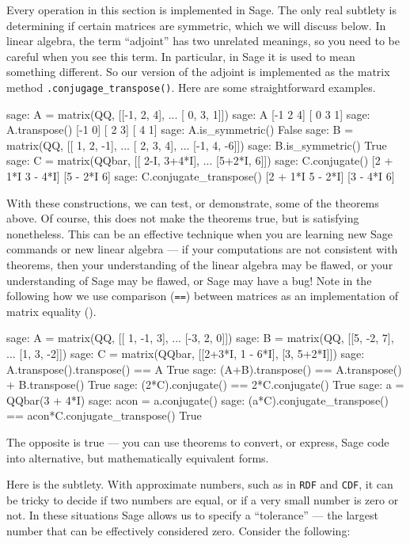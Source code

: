 Every operation in this section is implemented in Sage.  The only real subtlety is determining if certain matrices are symmetric, which we will discuss below.  In linear algebra, the term ``adjoint'' has two unrelated meanings, so you need to be careful when you see this term.  In particular, in Sage it is used to mean something different.  So our version of the adjoint is implemented as the matrix method \verb?.conjugage_transpose()?.  Here are some straightforward examples.
%
%
\begin{sageexample}
sage: A = matrix(QQ, [[-1, 2, 4],
...                   [ 0, 3, 1]])
sage: A
[-1  2  4]
[ 0  3  1]
sage: A.transpose()
[-1  0]
[ 2  3]
[ 4  1]
sage: A.is_symmetric()
False
sage: B = matrix(QQ, [[ 1, 2, -1],
...                   [ 2, 3,  4],
...                   [-1, 4, -6]])
sage: B.is_symmetric()
True
sage: C = matrix(QQbar, [[  2-I, 3+4*I],
...                      [5+2*I,     6]])
sage: C.conjugate()
[2 + 1*I 3 - 4*I]
[5 - 2*I       6]
sage: C.conjugate_transpose()
[2 + 1*I 5 - 2*I]
[3 - 4*I       6]
\end{sageexample}
%
With these constructions, we can test, or demonstrate, some of the theorems above.  Of course, this does not make the theorems true, but is satisfying nonetheless.  This can be an effective technique when you are learning new Sage commands or new linear algebra --- if your computations are not consistent with theorems, then your understanding of the linear algebra may be flawed, or your understanding of Sage may be flawed, or Sage may have a bug!  Note in the following how we use comparison (\verb?==?) between matrices as an implementation of matrix equality ().
%
%
\begin{sageexample}
sage: A = matrix(QQ, [[ 1, -1, 3],
...                   [-3,  2, 0]])
sage: B = matrix(QQ, [[5, -2,  7],
...                   [1,  3, -2]])
sage: C = matrix(QQbar, [[2+3*I, 1 - 6*I], [3, 5+2*I]])
sage: A.transpose().transpose() == A
True
sage: (A+B).transpose() == A.transpose() + B.transpose()
True
sage: (2*C).conjugate() == 2*C.conjugate()
True
sage: a = QQbar(3 + 4*I)
sage: acon = a.conjugate()
sage: (a*C).conjugate_transpose() == acon*C.conjugate_transpose()
True
\end{sageexample}
%
The opposite is true --- you can use theorems to convert, or express, Sage code into alternative, but mathematically equivalent forms.\par
%
Here is the subtlety.  With approximate numbers, such as in \verb?RDF? and \verb?CDF?, it can be tricky to decide if two numbers are equal, or if a very small number is zero or not.  In these situations Sage allows us to specify a ``tolerance'' --- the largest number that can be effectively considered zero.  Consider the following:

